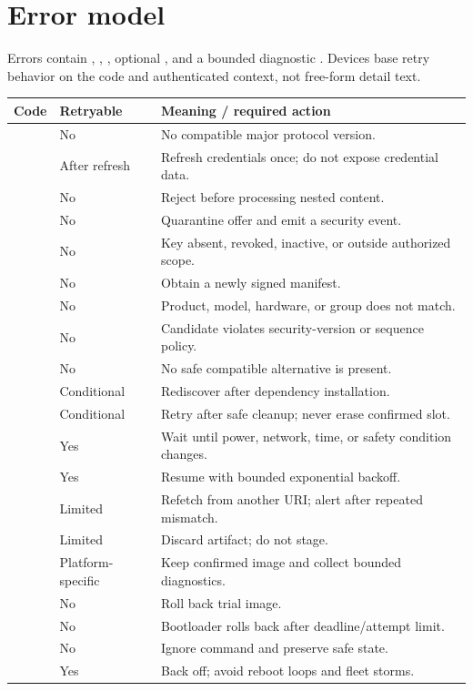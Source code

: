 \section{Error model}

Errors contain , , , optional
, and a bounded diagnostic . Devices \must base
retry behavior on the code and authenticated context, not free-form detail text.

\begin{longtable}{@{}L{55mm}L{22mm}L{75mm}@{}}
  \toprule
  \textbf{Code} & \textbf{Retryable} & \textbf{Meaning / required action} \\
  \midrule
  \endhead
   & No & No compatible major protocol version. \\
   & After refresh & Refresh credentials once; do not expose credential data. \\
   & No & Reject before processing nested content. \\
   & No & Quarantine offer and emit a security event. \\
   & No & Key absent, revoked, inactive, or outside authorized scope. \\
   & No & Obtain a newly signed manifest. \\
   & No & Product, model, hardware, or group does not match. \\
   & No & Candidate violates security-version or sequence policy. \\
   & No & No safe compatible alternative is present. \\
   & Conditional & Rediscover after dependency installation. \\
   & Conditional & Retry after safe cleanup; never erase confirmed slot. \\
   & Yes & Wait until power, network, time, or safety condition changes. \\
   & Yes & Resume with bounded exponential backoff. \\
   & Limited & Refetch from another URI; alert after repeated mismatch. \\
   & Limited & Discard artifact; do not stage. \\
   & Platform-specific & Keep confirmed image and collect bounded diagnostics. \\
   & No & Roll back trial image. \\
   & No & Bootloader rolls back after deadline/attempt limit. \\
   & No & Ignore command and preserve safe state. \\
   & Yes & Back off; avoid reboot loops and fleet storms. \\
  \bottomrule
\end{longtable}


